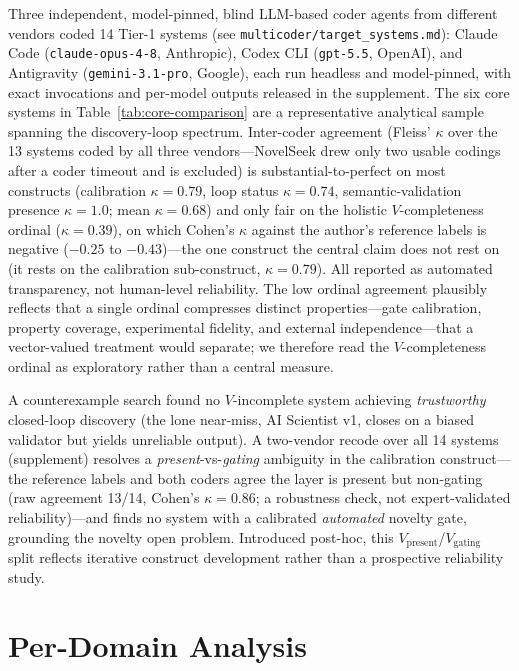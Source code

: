 \documentclass{article}
\begin{document}
Three independent, model-pinned, blind LLM-based coder agents from different vendors coded 14 Tier-1 systems (see \texttt{multicoder/target\_systems.md}): Claude Code (\texttt{claude-opus-4-8}, Anthropic), Codex CLI (\texttt{gpt-5.5}, OpenAI), and Antigravity (\texttt{gemini-3.1-pro}, Google), each run headless and model-pinned, with exact invocations and per-model outputs released in the supplement. The six core systems in Table~\ref{tab:core-comparison} are a representative analytical sample spanning the discovery-loop spectrum. Inter-coder agreement (Fleiss' $\kappa$ over the 13 systems coded by all three vendors---NovelSeek drew only two usable codings after a coder timeout and is excluded) is substantial-to-perfect on most constructs (calibration $\kappa{=}0.79$, loop status $\kappa{=}0.74$, semantic-validation presence $\kappa{=}1.0$; mean $\kappa{=}0.68$) and only fair on the holistic $V$-completeness ordinal ($\kappa{=}0.39$), on which Cohen's $\kappa$ against the author's reference labels is negative ($-0.25$ to $-0.43$)---the one construct the central claim does not rest on (it rests on the calibration sub-construct, $\kappa{=}0.79$). All reported as automated transparency, not human-level reliability. The low ordinal agreement plausibly reflects that a single ordinal compresses distinct properties---gate calibration, property coverage, experimental fidelity, and external independence---that a vector-valued treatment would separate; we therefore read the $V$-completeness ordinal as exploratory rather than a central measure.

A counterexample search found no $V$-incomplete system achieving \emph{trustworthy} closed-loop discovery (the lone near-miss, AI Scientist v1, closes on a biased validator but yields unreliable output). A two-vendor recode over all 14 systems (supplement) resolves a \emph{present}-vs-\emph{gating} ambiguity in the calibration construct---the reference labels and both coders agree the layer is present but non-gating (raw agreement 13/14, Cohen's $\kappa{=}0.86$; a robustness check, not expert-validated reliability)---and finds no system with a calibrated \emph{automated} novelty gate, grounding the novelty open problem. Introduced post-hoc, this $V_\text{present}$/$V_\text{gating}$ split reflects iterative construct development rather than a prospective reliability study.

\section{Per-Domain Analysis}
\label{app:domains}
\end{document}
